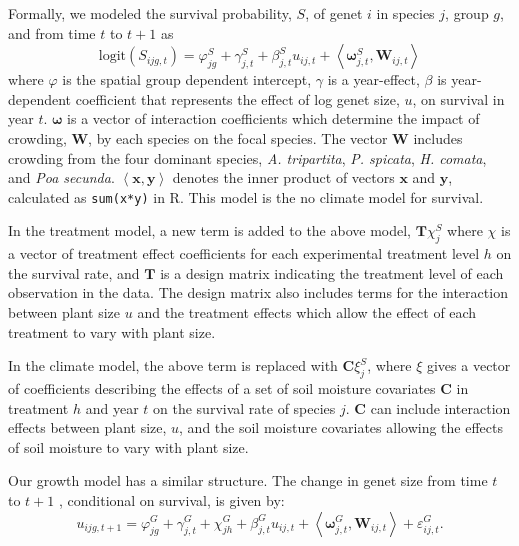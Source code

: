 \documentclass[11pt]{article}
\begin{document}
\begin{doublespace}
Formally, we modeled the survival probability, $S$, of genet $i$ in species $j$, group $g$, and from time $t$ to $t+1$  as
\begin{equation}
\mbox{logit}(S_{ijg,t}) = \varphi_{jg}^S + \gamma_{j,t}^S  + \beta_{j,t}^S u_{ij,t} +  
\left \langle \boldsymbol{\omega}_{j,t}^S, \boldsymbol{W}_{ij,t} \right \rangle 
\label{eqn:survReg}
\end{equation}
where $\varphi$ is the spatial group dependent intercept, $\gamma$ is a year-effect, $\beta$ is year-dependent coefficient that represents the effect of log genet size, $u$, on survival in year $t$. $\boldsymbol{\omega}$ is a vector of interaction coefficients which determine the impact of crowding, $\boldsymbol{W}$, by each species on the focal species. The vector $\boldsymbol{W}$ includes crowding from the four dominant species, \textit{A. tripartita}, \textit{P. spicata}, \textit{H. comata}, and \textit{Poa secunda}. 
$\left \langle \boldsymbol{x, y} \right \rangle$ denotes the inner product of vectors $\boldsymbol{x}$ and $\boldsymbol{y}$, 
calculated as \texttt{sum(x*y)} in R. This model is the no climate model for survival.

In the treatment model, a new term is added to the above model, $\boldsymbol{T}\chi_{j}^S$ where $\chi$ is a vector of treatment effect coefficients for each experimental treatment level $h$ on the survival rate, and $\boldsymbol{T}$ is a design matrix indicating the treatment level of each observation in the data. The design matrix also includes terms for the interaction between plant size $u$ and the treatment effects which allow the effect of each treatment to vary with plant size.  

In the climate model, the above term is replaced with $\boldsymbol{C}\xi_{j}^S$, where $\xi$ gives a vector of coefficients describing the effects of a set of soil moisture covariates $\boldsymbol{C}$ in treatment $h$ and year $t$ on the survival rate of species $j$. $\boldsymbol{C}$ can include interaction effects between plant size, $u$, and the soil moisture covariates allowing the effects of soil moisture to vary with plant size. 

Our growth model has a similar structure. The change in genet size from time $t$ to $t+1$ , conditional on survival, is given by:
\begin{equation}
u_{ijg,t+1} = \varphi_{jg}^G + \gamma_{j,t}^G + \chi_{jh}^G  + \beta_{j,t}^G u_{ij,t} + 
\left \langle  \boldsymbol{\omega}_{j,t}^G, \boldsymbol{W}_{ij,t} \right \rangle + \varepsilon_{ij,t}^G .
\label{eqn:growReg}
\end{equation}


\end{doublespace}
\end{document}
